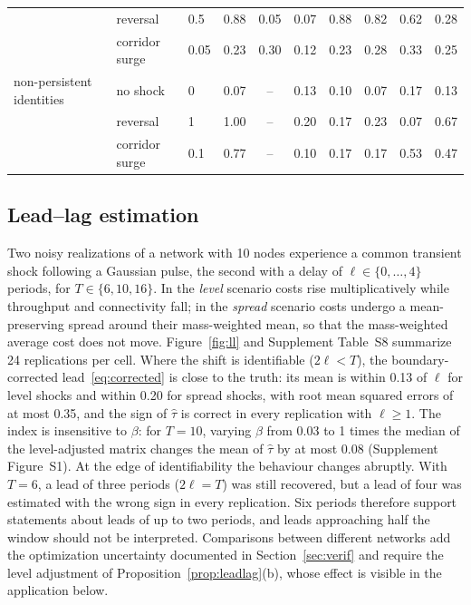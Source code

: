 \documentclass[12pt]{article}
\theoremstyle{definition}
\begin{document}
\begin{table}[hp]
\begin{tabular}{lllccccccc}
 & reversal & 0.5 & 0.88 & 0.05 & 0.07 & 0.88 & 0.82 & 0.62 & 0.28\\
 & corridor surge & 0.05 & 0.23 & 0.30 & 0.12 & 0.23 & 0.28 & 0.33 & 0.25\\
\addlinespace
non-persistent identities & no shock & 0 & 0.07 & -- & 0.13 & 0.10 & 0.07 & 0.17 & 0.13\\
 & reversal & 1 & 1.00 & -- & 0.20 & 0.17 & 0.23 & 0.07 & 0.67\\
 & corridor surge & 0.1 & 0.77 & -- & 0.10 & 0.17 & 0.17 & 0.53 & 0.47\\
\bottomrule
\end{tabular}

\end{table}

\subsection{Lead--lag estimation}\label{sec:simll}

Two noisy realizations of a network with 10 nodes experience a common transient shock following a Gaussian pulse, the second with a delay of $\ell\in\{0,\dots,4\}$ periods, for $T\in\{6,10,16\}$. In the \emph{level} scenario costs rise multiplicatively while throughput and connectivity fall; in the \emph{spread} scenario costs undergo a mean-preserving spread around their mass-weighted mean, so that the mass-weighted average cost does not move. Figure~\ref{fig:ll} and Supplement Table~S8 summarize 24 replications per cell. Where the shift is identifiable ($2\ell<T$), the boundary-corrected lead~\eqref{eq:corrected} is close to the truth: its mean is within 0.13 of $\ell$ for level shocks and within 0.20 for spread shocks, with root mean squared errors of at most 0.35, and the sign of $\hat\tau$ is correct in every replication with $\ell\ge1$. The index is insensitive to $\beta$: for $T=10$, varying $\beta$ from 0.03 to 1 times the median of the level-adjusted matrix changes the mean of $\hat\tau$ by at most 0.08 (Supplement Figure~S1). At the edge of identifiability the behaviour changes abruptly. With $T=6$, a lead of three periods ($2\ell=T$) was still recovered, but a lead of four was estimated with the wrong sign in every replication. Six periods therefore support statements about leads of up to two periods, and leads approaching half the window should not be interpreted. Comparisons between different networks add the optimization uncertainty documented in Section~\ref{sec:verif} and require the level adjustment of Proposition~\ref{prop:leadlag}(b), whose effect is visible in the application below.
\end{document}
